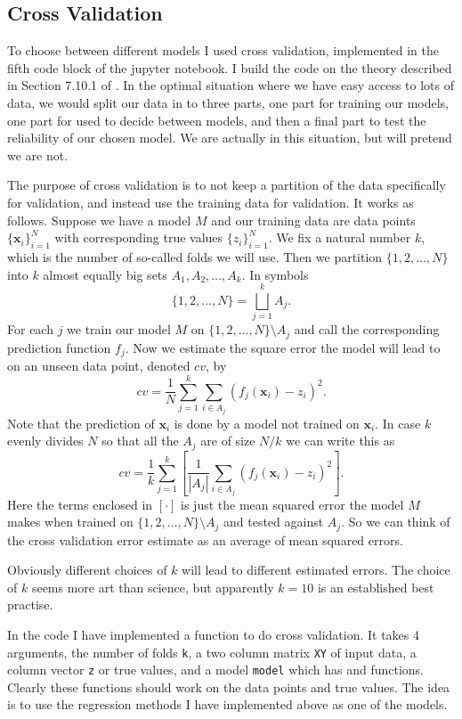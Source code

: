 \documentclass[parskip=half]{scrartcl}
\theoremstyle{definition}
\theoremstyle{remark}
\newcommand{\vect}[1]{{\bm{#1}}}
\newcommand{\funcname}[1]{{\color{blue}{\texttt{#1}}}}
\newcommand{\varname}[1]{\texttt{#1}}
\begin{document}
\subsection{Cross Validation}

To choose between different models I used cross validation, implemented in the fifth code block of the jupyter notebook. 
I build the code on the theory described in Section 7.10.1 of \cite{htf:esl}. 
In the optimal situation where we have easy access to lots of data, we would split our data in to three parts, one part for training our models, one part for used to decide between models, and then a final part to test the reliability of our chosen model. 
We are actually in this situation, but will pretend we are not. 

The purpose of cross validation is to not keep a partition of the data specifically for validation, and instead use the training data for validation. 
It works as follows.
Suppose we have a model $M$ and our training data are data points $\{\vect{x}_i\}_{i=1}^N$ with corresponding true values $\{z_i\}_{i=1}^N$.
We fix a natural number $k$, which is the number of so-called folds we will use.  
Then we partition $\{1,2,\ldots, N\}$ into $k$ almost equally big sets $A_1, A_2, \ldots, A_k$.
In symbols 
\[
	\{1,2,\ldots, N\} = \bigsqcup_{j=1}^k A_j.
\]  
For each $j$ we train our model $M$ on $\{1,2,\ldots, N\} \setminus A_j$ and call the corresponding prediction function $f_j$. 
Now we estimate the square error the model will lead to on an unseen data point, denoted $cv$, by 
\[
	cv = \frac{1}{N} \sum_{j=1}^k \sum_{i \in A_j} (f_j(\vect{x}_i) - z_i)^2. 
\]
Note that the prediction of $\vect{x}_i$ is done by a model not trained on $\vect{x}_i$.
In case $k$ evenly divides $N$ so that all the $A_j$ are of size $N/k$ we can write this as 
\[
	cv = \frac{1}{k} \sum_{j=1}^k \left[ \frac{1}{|A_j|} \sum_{i \in A_j} (f_j(\vect{x}_i) - z_i)^2 \right].
\]
Here the terms enclosed in $[\cdot]$ is just the mean squared error the model $M$ makes when trained on $\{1,2,\ldots, N\} \setminus A_j$ and tested against $A_j$.
So we can think of the cross validation error estimate as an average of mean squared errors. 

Obviously different choices of $k$ will lead to different estimated errors. 
The choice of $k$ seems more art than science, but apparently $k=10$ is an established best practise.

In the code I have implemented a function \funcname{cross{\_}validation} to do cross validation. 
It takes 4 arguments, the number of folds \varname{k}, a two column matrix \varname{XY} of input data, a column vector \varname{z} or true values, and a model \varname{model} which has \funcname{train} and \funcname{predict} functions. 
Clearly these functions should work on the data points and true values. 
The idea is to use the regression methods I have implemented above as one of the models. 
\end{document}
